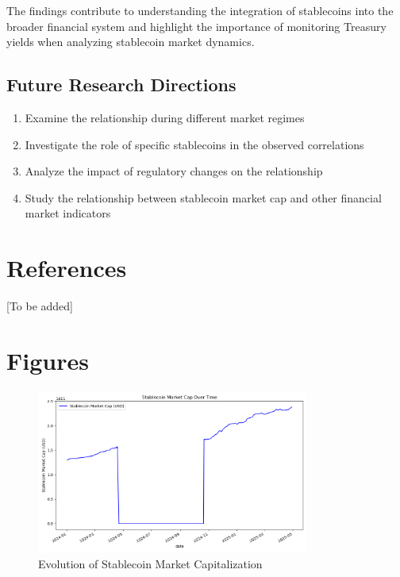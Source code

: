 \documentclass[12pt,a4paper]{article}
\begin{document}
The findings contribute to understanding the integration of stablecoins into the broader financial system and highlight the importance of monitoring Treasury yields when analyzing stablecoin market dynamics.

\subsection{Future Research Directions}
\begin{enumerate}
    \item Examine the relationship during different market regimes
    \item Investigate the role of specific stablecoins in the observed correlations
    \item Analyze the impact of regulatory changes on the relationship
    \item Study the relationship between stablecoin market cap and other financial market indicators
\end{enumerate}

\section*{References}
[To be added]

\section*{Figures}
\begin{figure}[H]
    \centering
    \includegraphics[width=0.8\textwidth]{figures/stablecoin_market_cap.png}
    \caption{Evolution of Stablecoin Market Capitalization}
    \label{fig:market_cap}
\end{figure}
\end{document}
